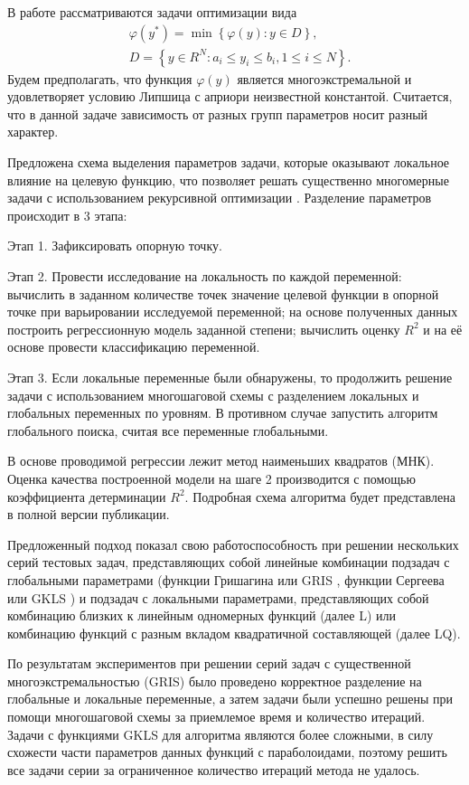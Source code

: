 \documentclass[11pt, oneside, a4paper]{article}
\begin{document}
В работе рассматриваются задачи оптимизации вида 
\begin{eqnarray}\label{main_problem}
& \varphi(y^\ast)=\min{\left\{\varphi(y): y\in D\right\}}, \nonumber \\
& D=\left\{y\in R^N: a_i\leq y_i \leq b_i, 1\leq i \leq N\right\}. \nonumber
\end{eqnarray}
Будем предполагать, что функция $\varphi(y)$ является многоэкстремальной и удовлетворяет условию Липшица с априори неизвестной константой. Считается, что в данной задаче зависимость от разных групп параметров носит разный характер.

Предложена схема выделения параметров задачи, которые оказывают локальное влияние на целевую функцию, что позволяет решать существенно многомерные задачи с использованием рекурсивной оптимизации \cite{Grishagin2007}. Разделение параметров происходит в 3 этапа:

Этап 1. Зафиксировать опорную точку. 

Этап 2. Провести исследование на локальность по каждой переменной: вычислить в заданном количестве точек значение целевой функции в опорной точке при варьировании исследуемой переменной; на основе полученных данных построить регрессионную модель заданной степени; вычислить оценку $R^2$ и на её основе провести классификацию переменной.

Этап 3. Если локальные переменные были обнаружены, то продолжить решение задачи с использованием многошаговой схемы с разделением локальных и глобальных переменных по уровням. В противном случае запустить алгоритм глобального поиска, считая все переменные глобальными.

В основе проводимой регрессии лежит метод наименьших квадратов (МНК). Оценка качества построенной модели на шаге 2 производится с помощью коэффициента детерминации $R^2$. Подробная схема алгоритма будет представлена в полной версии публикации.

Предложенный подход показал свою работоспособность при решении нескольких серий тестовых задач, представляющих собой линейные комбинации подзадач с глобальными параметрами (функции Гришагина или GRIS \cite{Grishagin1994}, функции Сергеева или GKLS \cite{Sergeyev2008}) и подзадач с локальными параметрами, представляющих собой комбинацию близких к линейным одномерных функций (далее L) или  комбинацию  функций с разным вкладом квадратичной составляющей (далее LQ).

По результатам экспериментов при решении серий задач с существенной многоэкстремальностью (GRIS) было проведено корректное разделение на глобальные и локальные переменные, а затем задачи были успешно решены при помощи многошаговой схемы за приемлемое время и количество итераций. Задачи с функциями  GKLS для алгоритма являются более сложными, в силу схожести части параметров данных функций с параболоидами, поэтому решить все задачи серии за ограниченное количество итераций метода не удалось.
\end{document}
